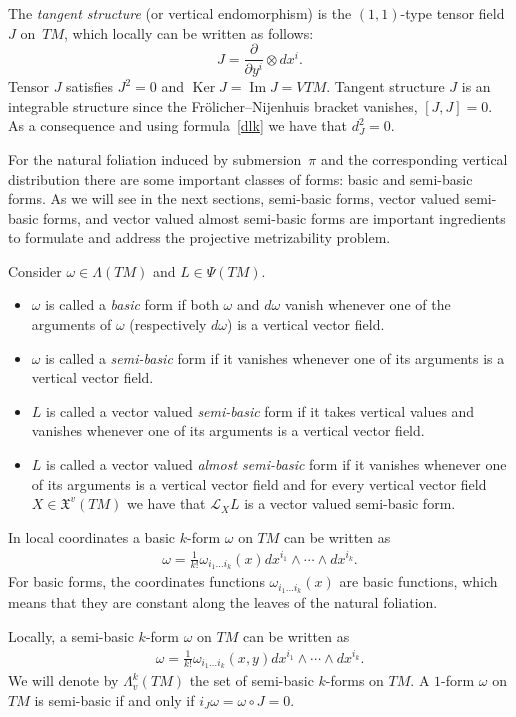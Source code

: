 \documentclass[11pt]{article}
\numberwithin{equation}{section}
\begin{document}
The \emph{tangent structure} (or vertical endomorphism) is the
$(1,1)$-type tensor f\/ield $J$ on~$TM$, which locally can be
written as follows:
\[
J=\frac{\partial}{\partial y^i} \otimes dx^i.
\]
Tensor $J$ satisf\/ies $J^2=0$ and $\operatorname{Ker} J=
\operatorname{Im} J=VTM$. Tangent structure $J$ is an integrable structure
since the Fr\"olicher--Nijenhuis bracket vanishes, $[J,J]=0$. As a consequence and using formula~\eqref{dlk} we have that
$d_J^2=0$.

For the natural foliation induced by submersion~$\pi$ and the
corresponding vertical distribution there are some important classes
of forms: basic and semi-basic forms. As we will see in the next
sections, semi-basic forms, vector valued semi-basic forms, and vector valued almost
semi-basic forms are important ingredients to formulate and
address the projective metrizability problem.
\begin{Definition} Consider $\omega\in \Lambda(TM)$ and $L\in \Psi(TM)$.
\begin{itemize}\itemsep=0pt
\item[i)] $\omega$ is called a \emph{basic} form if both $\omega$ and
  $d\omega$ vanish whenever one of the arguments of $\omega$
  (respectively $d\omega$) is a vertical vector f\/ield.
\item[ii)] $\omega$ is called a \emph{semi-basic} form if it vanishes whenever
one of its arguments is a vertical vector f\/ield.
\item[iii)] $L$ is called a vector valued \emph{semi-basic} form if it takes vertical values and vanishes
whenever one of its arguments is a vertical vector f\/ield.
\item[iv)] $L$ is called a vector valued \emph{almost semi-basic} form
  if it vanishes whenever one of its arguments is a vertical vector f\/ield
and for every vertical vector f\/ield $X\in {\mathfrak X}^v(TM)$ we
have that $\mathcal{L}_XL$ is a vector valued semi-basic form.
\end{itemize}
\end{Definition}
In local coordinates a basic $k$-form $\omega$ on $TM$ can
be written as
\begin{gather*}
 \omega=\frac{1}{k!}\omega_{i_1\dots i_k}(x)dx^{i_1}\wedge \cdots
\wedge dx^{i_k}.%
\end{gather*}
For basic forms, the coordinates functions $\omega_{i_1\dots i_k}(x)$ are basic
functions, which means that they are constant along the leaves of the
natural foliation.

Locally, a semi-basic $k$-form $\omega$ on $TM$ can
be written as
\begin{gather}
 \omega=\frac{1}{k!}\omega_{i_1\dots i_k}(x,y)dx^{i_1}\wedge \cdots
\wedge dx^{i_k}.\label{eq:smf}
\end{gather}
We will denote by $\Lambda^k_v(TM)$ the set of
semi-basic $k$-forms on $TM$. A $1$-form $\omega$ on $TM$ is
semi-basic if and only if $i_J\omega=\omega \circ J=0$.
\end{document}
